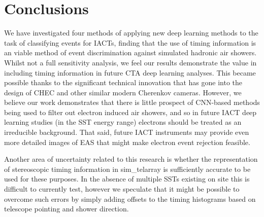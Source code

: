 \section{Conclusions} \label{Conclusions}
We have investigated four methods of applying new deep learning methods to the task of classifying events for IACTs, finding that the use of timing information is an viable method of event discrimination against simulated hadronic air showers. Whilst not a full sensitivity analysis, we feel our results demonstrate the value in including timing information in future CTA deep learning analyses. This became possible thanks to the significant technical innovation that has gone into the design of CHEC and other similar modern Cherenkov cameras. However, we believe our work demonstrates that there is little prospect of CNN-based methods being used to filter out electron induced air showers, and so in future IACT deep learning studies (in the SST energy range) electrons should be treated as an irreducible background. That said, future IACT instruments may provide even more detailed images of EAS that might make electron event rejection feasible.

Another area of uncertainty related to this research is whether the representation of stereoscopic timing information in sim\_telarray is sufficiently accurate to be used for these purposes. In the absence of multiple SSTs existing on site this is difficult to currently test, however we speculate that it might be possible to overcome such errors by simply adding offsets to the timing histograms based on telescope pointing and shower direction.

